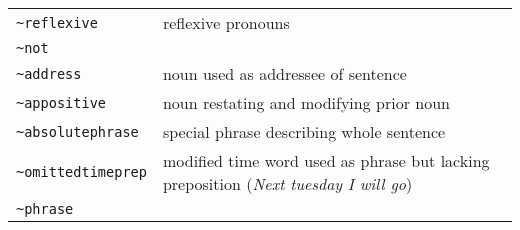 \documentclass[]{article}
\begin{document}
\begin{longtable}[]{@{}ll@{}}
\begin{minipage}[t]{0.30\columnwidth}\raggedright\strut
\texttt{\textasciitilde{}reflexive}\strut
\end{minipage} & \begin{minipage}[t]{0.20\columnwidth}\raggedright\strut
reflexive pronouns\strut
\end{minipage}\tabularnewline
\begin{minipage}[t]{0.30\columnwidth}\raggedright\strut
\texttt{\textasciitilde{}not}\strut
\end{minipage} & \begin{minipage}[t]{0.20\columnwidth}\raggedright\strut
\strut
\end{minipage}\tabularnewline
\begin{minipage}[t]{0.30\columnwidth}\raggedright\strut
\texttt{\textasciitilde{}address}\strut
\end{minipage} & \begin{minipage}[t]{0.20\columnwidth}\raggedright\strut
noun used as addressee of sentence\strut
\end{minipage}\tabularnewline
\begin{minipage}[t]{0.30\columnwidth}\raggedright\strut
\texttt{\textasciitilde{}appositive}\strut
\end{minipage} & \begin{minipage}[t]{0.20\columnwidth}\raggedright\strut
noun restating and modifying prior noun\strut
\end{minipage}\tabularnewline
\begin{minipage}[t]{0.30\columnwidth}\raggedright\strut
\texttt{\textasciitilde{}absolutephrase}\strut
\end{minipage} & \begin{minipage}[t]{0.20\columnwidth}\raggedright\strut
special phrase describing whole sentence\strut
\end{minipage}\tabularnewline
\begin{minipage}[t]{0.30\columnwidth}\raggedright\strut
\texttt{\textasciitilde{}omittedtimeprep}\strut
\end{minipage} & \begin{minipage}[t]{0.20\columnwidth}\raggedright\strut
modified time word used as phrase but lacking preposition (\emph{Next
tuesday I will go})\strut
\end{minipage}\tabularnewline
\begin{minipage}[t]{0.30\columnwidth}\raggedright\strut
\texttt{\textasciitilde{}phrase}\strut
\end{minipage} & \begin{minipage}[t]{0.20\columnwidth}\raggedright\strut

\end{minipage}
\end{longtable}
\end{document}
